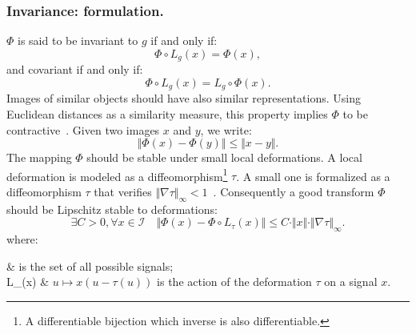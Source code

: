         \subsubsection{Invariance: formulation.}
            $\Phi$ is said to be invariant to $g$ if and only if:
            \begin{equation}
                \label{eq::invariance}
                \Phi\circ L_g\left(x\right) = \Phi(x),
            \end{equation}
            and covariant if and only if:
            \begin{equation}
                \label{eq::covariance}
                \Phi\circ L_g\left(x\right) = L_g\circ\Phi(x).
            \end{equation}
            Images of similar objects should have also similar representations.
            Using Euclidean distances as a similarity measure, this property implies $\Phi$ to be contractive~\parencite{bruna2013invariant}.
            Given two images $x$ and $y$, we write:
            \begin{equation}
                \label{eq::contractive}
                \Vert \Phi(x) - \Phi(y) \Vert \leq \Vert x-y \Vert.
            \end{equation}
            The mapping $\Phi$ should be stable under small local deformations.
            A local deformation is modeled as a diffeomorphism\footnote{A differentiable bijection which inverse is also differentiable.} $\tau$.
            A small one is formalized as a diffeomorphism $\tau$ that verifies $\Vert\nabla \tau\Vert_\infty < 1$~\parencite{mallat2012group,bruna2013invariant,sifre2013rotation}.
            Consequently a good transform $\Phi$ should be Lipschitz stable to deformations:
            \begin{equation}
                \label{eq::stable_deformation}
                \exists C >0, \forall x \in \mathscr{I}\quad \Vert \Phi(x) - \Phi\circ L_\tau(x) \Vert \leq C \cdot \Vert x\Vert \cdot \Vert\nabla \tau\Vert_\infty.
            \end{equation}
            where:
            \begin{conditions}
                 & is the set of all possible signals;\\
                L_\tau(x) & $u \mapsto x(u - \tau(u))$ is the action of the deformation $\tau$ on a signal $x$.
            \end{conditions}


